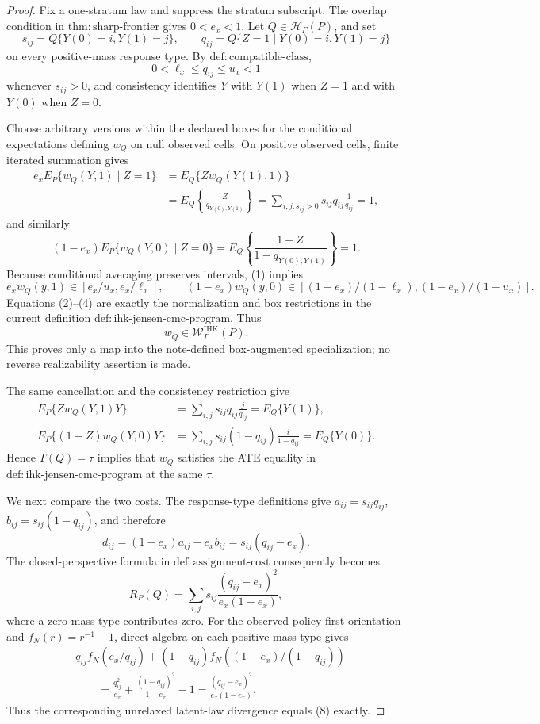 \documentclass{article}
\begin{document}
\begin{proof}
Fix a one-stratum law and suppress the stratum subscript.  The overlap condition in \(\mathrm{thm{:}sharp\mbox{-}frontier}\) gives \(0<e_x<1\).  Let \(Q\in\mathcal H_\Gamma(P)\), and set
\[
s_{ij}=Q\{Y(0)=i,Y(1)=j\},
\qquad
q_{ij}=Q\{Z=1\mid Y(0)=i,Y(1)=j\}
\]
on every positive-mass response type.  By \(\mathrm{def{:}compatible\mbox{-}class}\),
\[
0<\ell_x\leq q_{ij}\leq u_x<1
\tag{1}
\]
whenever \(s_{ij}>0\), and consistency identifies \(Y\) with \(Y(1)\) when \(Z=1\) and with \(Y(0)\) when \(Z=0\).

Choose arbitrary versions within the declared boxes for the conditional expectations defining \(w_Q\) on null observed cells.  On positive observed cells, finite iterated summation gives
\[
\begin{aligned}
e_xE_P\{w_Q(Y,1)\mid Z=1\}
&=E_Q\{Z w_Q(Y(1),1)\}\\
&=E_Q\!\left\{\frac{Z}{q_{Y(0),Y(1)}}\right\}
=\sum_{i,j:s_{ij}>0}s_{ij}q_{ij}\frac{1}{q_{ij}}=1,
\end{aligned}
\tag{2}
\]
and similarly
\[
(1-e_x)E_P\{w_Q(Y,0)\mid Z=0\}
=E_Q\!\left\{\frac{1-Z}{1-q_{Y(0),Y(1)}}\right\}=1.
\tag{3}
\]
Because conditional averaging preserves intervals, (1) implies
\[
e_xw_Q(y,1)\in[e_x/u_x,e_x/\ell_x],
\qquad
(1-e_x)w_Q(y,0)
\in[(1-e_x)/(1-\ell_x),(1-e_x)/(1-u_x)].
\tag{4}
\]
Equations (2)--(4) are exactly the normalization and box restrictions in the current definition \(\mathrm{def{:}ihk\mbox{-}jensen\mbox{-}cmc\mbox{-}program}\).  Thus
\[
w_Q\in\mathcal W^{\mathrm{IHK}}_\Gamma(P).
\tag{5}
\]
This proves only a map into the note-defined box-augmented specialization; no reverse realizability assertion is made.

The same cancellation and the consistency restriction give
\[
\begin{aligned}
E_P\{Zw_Q(Y,1)Y\}
&=\sum_{i,j}s_{ij}q_{ij}\frac{j}{q_{ij}}
=E_Q\{Y(1)\},\\
E_P\{(1-Z)w_Q(Y,0)Y\}
&=\sum_{i,j}s_{ij}(1-q_{ij})\frac{i}{1-q_{ij}}
=E_Q\{Y(0)\}.
\end{aligned}
\tag{6}
\]
Hence \(T(Q)=\tau\) implies that \(w_Q\) satisfies the ATE equality in \(\mathrm{def{:}ihk\mbox{-}jensen\mbox{-}cmc\mbox{-}program}\) at the same \(\tau\).

We next compare the two costs.  The response-type definitions give \(a_{ij}=s_{ij}q_{ij}\), \(b_{ij}=s_{ij}(1-q_{ij})\), and therefore
\[
d_{ij}=(1-e_x)a_{ij}-e_xb_{ij}=s_{ij}(q_{ij}-e_x).
\tag{7}
\]
The closed-perspective formula in \(\mathrm{def{:}assignment\mbox{-}cost}\) consequently becomes
\[
R_P(Q)=\sum_{i,j}s_{ij}\frac{(q_{ij}-e_x)^2}{e_x(1-e_x)},
\tag{8}
\]
where a zero-mass type contributes zero.  For the observed-policy-first orientation and \(f_N(r)=r^{-1}-1\), direct algebra on each positive-mass type gives
\[
\begin{aligned}
&q_{ij}f_N(e_x/q_{ij})
+(1-q_{ij})f_N((1-e_x)/(1-q_{ij}))\\
&\qquad=\frac{q_{ij}^2}{e_x}
+\frac{(1-q_{ij})^2}{1-e_x}-1
=\frac{(q_{ij}-e_x)^2}{e_x(1-e_x)}.
\end{aligned}
\tag{9}
\]
Thus the corresponding unrelaxed latent-law divergence equals (8) exactly.


\end{proof}
\end{document}

